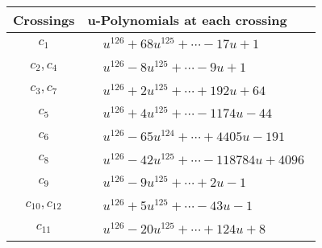 \documentclass[1p]{elsarticle_modified}
\theoremstyle{definition}
\begin{document}
\begin{tabular}{m{50pt}|m{274pt}}
Crossings & \hspace{64pt}u-Polynomials at each crossing \\
\hline $$\begin{aligned}c_{1}\end{aligned}$$&$\begin{aligned}
&u^{126}+68 u^{125}+\cdots-17 u+1
\end{aligned}$\\
\hline $$\begin{aligned}c_{2},c_{4}\end{aligned}$$&$\begin{aligned}
&u^{126}-8 u^{125}+\cdots-9 u+1
\end{aligned}$\\
\hline $$\begin{aligned}c_{3},c_{7}\end{aligned}$$&$\begin{aligned}
&u^{126}+2 u^{125}+\cdots+192 u+64
\end{aligned}$\\
\hline $$\begin{aligned}c_{5}\end{aligned}$$&$\begin{aligned}
&u^{126}+4 u^{125}+\cdots-1174 u-44
\end{aligned}$\\
\hline $$\begin{aligned}c_{6}\end{aligned}$$&$\begin{aligned}
&u^{126}-65 u^{124}+\cdots+4405 u-191
\end{aligned}$\\
\hline $$\begin{aligned}c_{8}\end{aligned}$$&$\begin{aligned}
&u^{126}-42 u^{125}+\cdots-118784 u+4096
\end{aligned}$\\
\hline $$\begin{aligned}c_{9}\end{aligned}$$&$\begin{aligned}
&u^{126}-9 u^{125}+\cdots+2 u-1
\end{aligned}$\\
\hline $$\begin{aligned}c_{10},c_{12}\end{aligned}$$&$\begin{aligned}
&u^{126}+5 u^{125}+\cdots-43 u-1
\end{aligned}$\\
\hline $$\begin{aligned}c_{11}\end{aligned}$$&$\begin{aligned}
&u^{126}-20 u^{125}+\cdots+124 u+8
\end{aligned}$\\
\hline
\end{tabular}\\~\\
\end{document}
